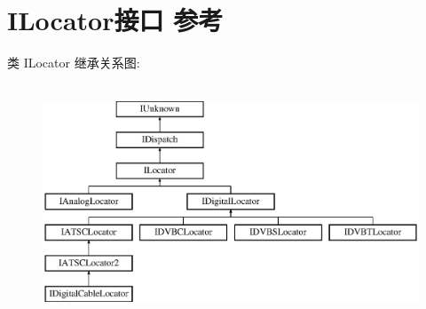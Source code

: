 \hypertarget{interface_i_locator}{}\section{I\+Locator接口 参考}
\label{interface_i_locator}
类 I\+Locator 继承关系图\+:\begin{figure}[H]
\begin{center}
\leavevmode
\includegraphics[height=7.000000cm]{interface_i_locator}
\end{center}
\end{figure}
